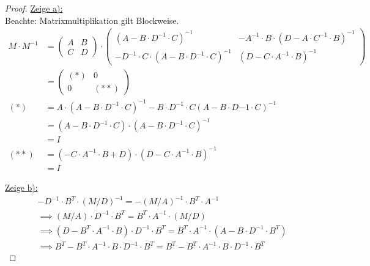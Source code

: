 \documentclass[12pt,a4paper]{article}
\begin{document}
\begin{proof}
\underline{Zeige a):}\\
Beachte: Matrixmultiplikation gilt Blockweise.
\begin{align*}
M\cdot M^{-1}
&=\begin{pmatrix}
A & B\\ C & D
\end{pmatrix}\cdot\begin{pmatrix}
(A-B\cdot D^{-1}\cdot C)^{-1} & -A^{-1}\cdot B\cdot(D-A\cdot C^{-1}\cdot B)^{-1}\\
-D^{-1}\cdot C\cdot(A-B\cdot D^{-1}\cdot C)^{-1} & (D-C\cdot A^{-1}\cdot B)^{-1}
\end{pmatrix}\\
&=\begin{pmatrix}
(\ast) & 0\\
0 & (\ast\ast)
\end{pmatrix}\\
(\ast)
&=A\cdot(A-B\cdot D^{-1}\cdot C)^{-1}-B\cdot D^{-1}\cdot C(A-B\cdot D{-1}\cdot C)^{-1}\\
&=(A-B\cdot D^{-1}\cdot C)\cdot(A-B\cdot D^{-1}\cdot C)^{-1}\\
&=I\\
(\ast\ast)
&=(-C\cdot A^{-1}\cdot B+D)\cdot(D-C\cdot A^{-1}\cdot B)^{-1}\\
&=I
\end{align*}

\underline{Zeige b):}\\
\begin{align}\label{3b1}\tag{$\ast$} 
&-D^{-1}\cdot B^T\cdot(M/D)^{-1}
=-(M/A)^{-1}\cdot B^T\cdot A^{-1}\\\nonumber
&\implies
(M/A)\cdot D^{-1}\cdot B^T=B^T\cdot A^{-1}\cdot(M/D)\\\nonumber
&\implies
(D-B^T\cdot A^{-1}\cdot B)\cdot D^{-1}\cdot B^T=B^T\cdot A^{-1}\cdot(A-B\cdot D^{-1}\cdot B^T)\\\nonumber
&\implies
B^T-B^T\cdot A^{-1}\cdot B\cdot D^{-1}\cdot B^T
=B^T-B^T\cdot A^{-1}\cdot B\cdot D^{-1}\cdot B^T
\end{align}


\end{proof}
\end{document}

